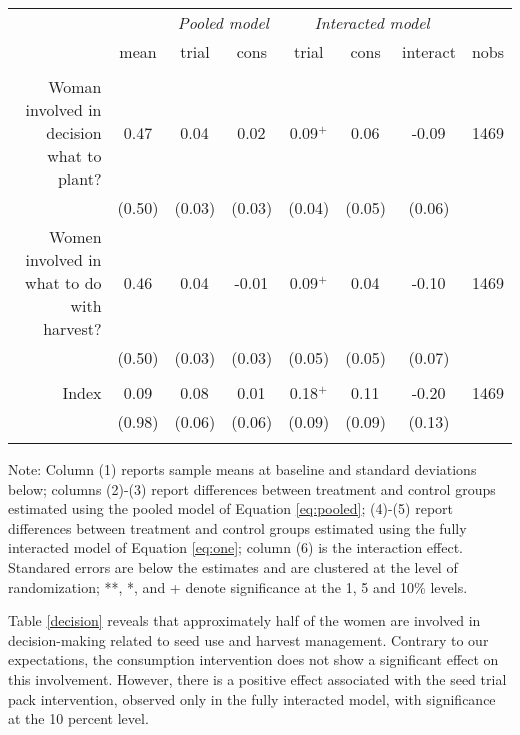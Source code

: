 \documentclass[english]{article}\usepackage[]{graphicx}\usepackage[]{xcolor}
\begin{document}
\begin{sidewaystable}
\caption{Impact on women co-head involvement (random plot)\label{decision}}

\footnotesize
\begin{center}
\begin{tabular}{rccccccc}
\hline\hline
& & \multicolumn{2}{c}{\textit{Pooled model}} & \multicolumn{3}{c}{\textit{Interacted model}} \\
& mean & trial & cons & trial & cons & interact & nobs \\
\hline
\\
Woman involved in decision what to plant?
& 0.47
& 0.04$^{}$
& 0.02$^{}$ 
& 0.09$^{+}$ 
& 0.06$^{}$
& -0.09$^{}$ & 1469 \\

& (0.50) & (0.03)  & (0.03) & (0.04)  & (0.05)  & (0.06)
 \\

Women involved in what to do with harvest?
& 0.46
& 0.04$^{}$
& -0.01$^{}$ 
& 0.09$^{+}$ 
& 0.04$^{}$
& -0.10$^{}$ & 1469 \\

& (0.50) & (0.03)  & (0.03) & (0.05)  & (0.05)  & (0.07)
 \\
\\
Index
& 0.09
& 0.08$^{}$
& 0.01$^{}$ 
& 0.18$^{+}$ 
& 0.11$^{}$
& -0.20$^{}$ & 1469 \\

& (0.98) & (0.06)  & (0.06) & (0.09)  & (0.09)  & (0.13)
 \\

\\
\hline\hline
\end{tabular}
\end{center}
\scriptsize
Note: Column (1) reports sample means at baseline and standard deviations below;  columns (2)-(3) report differences between treatment and control groups estimated using the pooled model of Equation  \ref{eq:pooled}; (4)-(5) report differences between treatment and control groups estimated using the fully interacted model of Equation \ref{eq:one}; column (6) is the interaction effect. Standared errors are below the estimates and are clustered at the level of randomization; **, *, and + denote significance at the 1, 5 and 10\% levels.
\end{sidewaystable}

Table \ref{decision} reveals that approximately half of the women
are involved in decision-making related to seed use and harvest management.
Contrary to our expectations, the consumption intervention does not
show a significant effect on this involvement. However, there is a
positive effect associated with the seed trial pack intervention,
observed only in the fully interacted model, with significance at
the 10 percent level.
\end{document}
